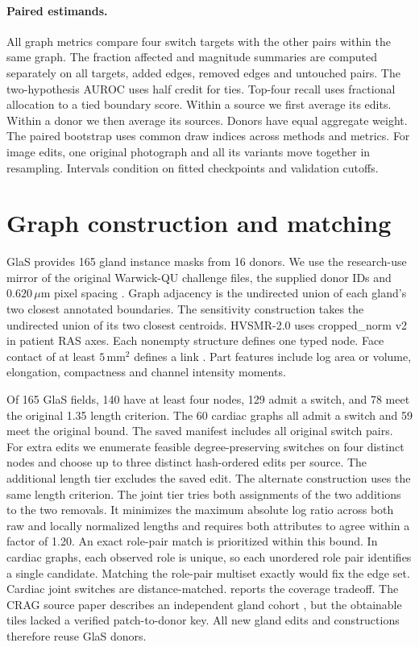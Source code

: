 \documentclass[10pt,twocolumn,letterpaper]{article}
\begin{document}
\paragraph{Paired estimands.}
All graph metrics compare four switch targets with the other pairs within the same graph. The fraction affected and magnitude summaries are computed separately on all targets, added edges, removed edges and untouched pairs. The two-hypothesis AUROC uses half credit for ties. Top-four recall uses fractional allocation to a tied boundary score. Within a source we first average its edits. Within a donor we then average its sources. Donors have equal aggregate weight. The paired bootstrap uses common draw indices across methods and metrics. For image edits, one original photograph and all its variants move together in resampling. Intervals condition on fitted checkpoints and validation cutoffs.

\section{Graph construction and matching}
GlaS provides 165 gland instance masks from 16 donors. We use the research-use mirror of the original Warwick-QU challenge files, the supplied donor IDs and $0.620\,\mu$m pixel spacing \cite{glas2017}. Graph adjacency is the undirected union of each gland's two closest annotated boundaries. The sensitivity construction takes the undirected union of its two closest centroids. HVSMR-2.0 uses cropped\_norm v2 in patient RAS axes. Each nonempty structure defines one typed node. Face contact of at least $5\,\mathrm{mm}^2$ defines a link \cite{pace2024}. Part features include log area or volume, elongation, compactness and channel intensity moments.

Of 165 GlaS fields, 140 have at least four nodes, 129 admit a switch, and 78 meet the original 1.35 length criterion. The 60 cardiac graphs all admit a switch and 59 meet the original bound. The saved manifest includes all original switch pairs. For extra edits we enumerate feasible degree-preserving switches on four distinct nodes and choose up to three distinct hash-ordered edits per source. The additional length tier excludes the saved edit. The alternate construction uses the same length criterion. The joint tier tries both assignments of the two additions to the two removals. It minimizes the maximum absolute log ratio across both raw and locally normalized lengths and requires both attributes to agree within a factor of 1.20. An exact role-pair match is prioritized within this bound. In cardiac graphs, each observed role is unique, so each unordered role pair identifies a single candidate. Matching the role-pair multiset exactly would fix the edge set. Cardiac joint switches are distance-matched.  reports the coverage tradeoff. The CRAG source paper describes an independent gland cohort \cite{graham2019mild}, but the obtainable tiles lacked a verified patch-to-donor key. All new gland edits and constructions therefore reuse GlaS donors.
\end{document}
